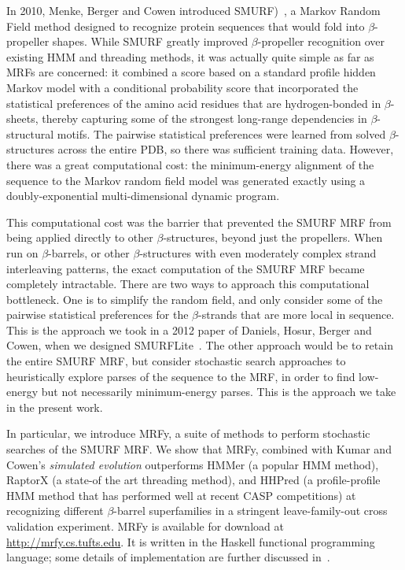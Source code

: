 \documentclass{acm_proc_article-sp}
\begin{document}
In 2010, Menke, Berger and Cowen introduced
SMURF)~\cite{Menke:2010ti}, a Markov Random Field method designed to
recognize protein sequences that would fold into $\beta$-propeller
shapes. 
While SMURF greatly improved $\beta$-propeller recognition over
existing HMM and threading methods, it was actually quite simple as
far as MRFs are concerned: it combined a score based on a standard profile 
hidden Markov model with a conditional probability score that incorporated
the statistical preferences of the amino acid residues that are
hydrogen-bonded in $\beta$-sheets, thereby capturing some of the
strongest long-range dependencies in $\beta$-structural motifs.
The
pairwise statistical preferences were learned from solved
$\beta$-structures across the entire PDB, so there was sufficient
training data. 
However, there was a great computational cost: the
minimum-energy alignment of the sequence to the Markov random field model
was generated exactly using a doubly-exponential multi-dimensional
dynamic program.


This computational cost was the barrier that prevented the SMURF MRF
from being applied directly to other $\beta$-structures, beyond just
the propellers.  
When run on $\beta$-barrels, or other $\beta$-structures with
even moderately complex strand interleaving patterns, the exact
computation of the SMURF MRF became completely intractable. 
There are two ways to approach this computational bottleneck. 
One is to simplify the random field, and only consider some of the pairwise 
statistical preferences for the $\beta$-strands that are more local in sequence.
This is the approach we took in a 2012 paper of Daniels, Hosur, Berger
and Cowen, when we designed SMURFLite~\cite{Daniels:2012dg}. 
The other approach would be to retain the entire SMURF MRF, but consider
stochastic search approaches to heuristically explore parses of the
sequence to the MRF, in order to find low-energy but not necessarily
minimum-energy parses.
This is the approach we take in the present work.

In particular, we introduce MRFy, a suite of methods to perform
stochastic searches of the SMURF MRF. 
We show that MRFy, combined with Kumar and Cowen's {\em simulated evolution\/} 
outperforms HMMer (a popular HMM method), RaptorX (a state-of the art threading 
method), and HHPred (a profile-profile HMM method that has performed well at 
recent CASP competitions) at recognizing different $\beta$-barrel superfamilies
in a stringent leave-family-out cross validation experiment. 
MRFy is available for download at \url{http://mrfy.cs.tufts.edu}. 
It is written in the Haskell functional programming language; some details of 
implementation are further discussed in~\cite{Daniels:2012cm}.
\end{document}
